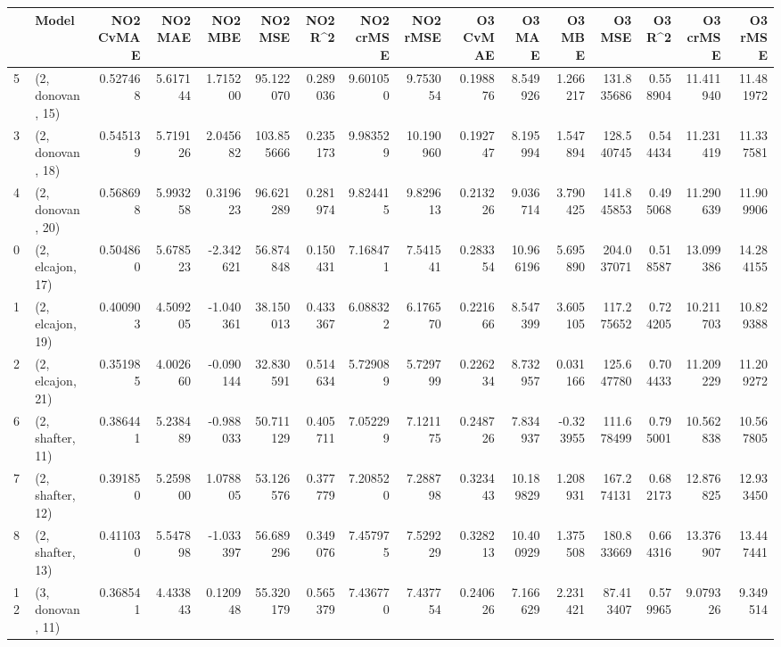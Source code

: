 \begin{tabular}{llrrrrrrrrrrrrrr}
\toprule
{} &             Model &  NO2 CvMAE &   NO2 MAE &   NO2 MBE &     NO2 MSE &   NO2 R\textasciicircum 2 &  NO2 crMSE &   NO2 rMSE &  O3 CvMAE &     O3 MAE &    O3 MBE &      O3 MSE &    O3 R\textasciicircum 2 &   O3 crMSE &    O3 rMSE \\
\midrule
5  &  (2, donovan, 15) &   0.527468 &  5.617144 &  1.715200 &   95.122070 &  0.289036 &   9.601050 &   9.753054 &  0.198876 &   8.549926 &  1.266217 &  131.835686 &  0.558904 &  11.411940 &  11.481972 \\
3  &  (2, donovan, 18) &   0.545139 &  5.719126 &  2.045682 &  103.855666 &  0.235173 &   9.983529 &  10.190960 &  0.192747 &   8.195994 &  1.547894 &  128.540745 &  0.544434 &  11.231419 &  11.337581 \\
4  &  (2, donovan, 20) &   0.568698 &  5.993258 &  0.319623 &   96.621289 &  0.281974 &   9.824415 &   9.829613 &  0.213226 &   9.036714 &  3.790425 &  141.845853 &  0.495068 &  11.290639 &  11.909906 \\
0  &  (2, elcajon, 17) &   0.504860 &  5.678523 & -2.342621 &   56.874848 &  0.150431 &   7.168471 &   7.541541 &  0.283354 &  10.966196 &  5.695890 &  204.037071 &  0.518587 &  13.099386 &  14.284155 \\
1  &  (2, elcajon, 19) &   0.400903 &  4.509205 & -1.040361 &   38.150013 &  0.433367 &   6.088322 &   6.176570 &  0.221666 &   8.547399 &  3.605105 &  117.275652 &  0.724205 &  10.211703 &  10.829388 \\
2  &  (2, elcajon, 21) &   0.351985 &  4.002660 & -0.090144 &   32.830591 &  0.514634 &   5.729089 &   5.729799 &  0.226234 &   8.732957 &  0.031166 &  125.647780 &  0.704433 &  11.209229 &  11.209272 \\
6  &  (2, shafter, 11) &   0.386441 &  5.238489 & -0.988033 &   50.711129 &  0.405711 &   7.052299 &   7.121175 &  0.248726 &   7.834937 & -0.323955 &  111.678499 &  0.795001 &  10.562838 &  10.567805 \\
7  &  (2, shafter, 12) &   0.391850 &  5.259800 &  1.078805 &   53.126576 &  0.377779 &   7.208520 &   7.288798 &  0.323443 &  10.189829 &  1.208931 &  167.274131 &  0.682173 &  12.876825 &  12.933450 \\
8  &  (2, shafter, 13) &   0.411030 &  5.547898 & -1.033397 &   56.689296 &  0.349076 &   7.457975 &   7.529229 &  0.328213 &  10.400929 &  1.375508 &  180.833669 &  0.664316 &  13.376907 &  13.447441 \\
12 &  (3, donovan, 11) &   0.368541 &  4.433843 &  0.120948 &   55.320179 &  0.565379 &   7.436770 &   7.437754 &  0.240626 &   7.166629 &  2.231421 &   87.413407 &  0.579965 &   9.079326 &   9.349514 \\

\end{tabular}
